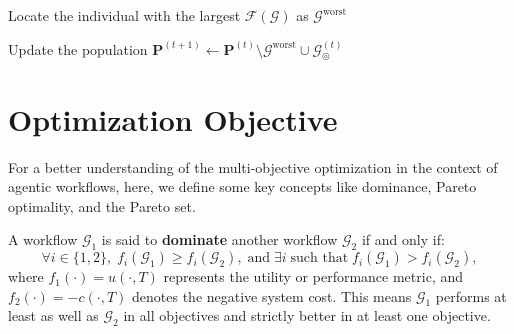 \documentclass{article}
\theoremstyle{plain}
\theoremstyle{definition}
\theoremstyle{remark}
\begin{document}
\begin{algorithm}[!t]
{\tcc{\textcolor{blue}{Execute parents, offsprings and niching-area workflows}}



Locate the individual with the largest $\mathcal{F}(\mathcal{G})$ as $\mathcal{G}^\text{worst}$

\tcc{\textcolor{blue}{Update the population}}

Update the population $\mathbf{P}^{(t+1)} \leftarrow \mathbf{P}^{(t)} \setminus\mathcal{G}^\text{worst} \cup \mathcal{G}_\circledcirc^{(t)}$

\tcc{\textcolor{blue}{Notably, if the generated workflow performs suboptimally, i.e., it does not Pareto dominate any existing workflows, it is unlikely to be accepted into the population.}}

}
\end{algorithm}


\section{Optimization Objective}
\label{app:obj}


For a better understanding of the multi-objective optimization in the context of agentic workflows, here, we define some key concepts like dominance, Pareto optimality, and the Pareto set. 

A workflow \(\mathcal{G}_1\) is said to \textbf{dominate} another workflow \(\mathcal{G}_2\) if and only if:  
\begin{equation}
\forall i \in \{1, 2\}, \; f_i(\mathcal{G}_1) \geq f_i(\mathcal{G}_2), \; \text{and} \; \exists i \; \text{such that} \; f_i(\mathcal{G}_1) > f_i(\mathcal{G}_2),
\end{equation}  
where \(f_1(\cdot) = u(\cdot, T)\) represents the utility or performance metric, and \(f_2(\cdot) = -c(\cdot, T)\) denotes the negative system cost. This means \(\mathcal{G}_1\) performs at least as well as \(\mathcal{G}_2\) in all objectives and strictly better in at least one objective.  
\end{document}
